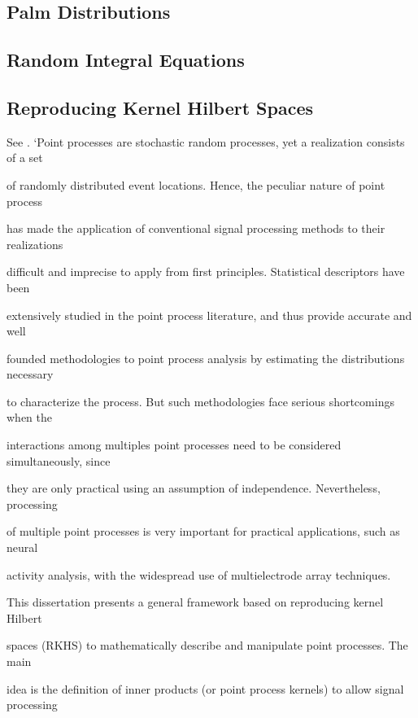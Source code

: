 \documentclass{amsart}
\begin{document}
\subsection{Palm Distributions}

{\cite[1.7]{karr}}

\subsection{Random Integral Equations}

{\cite{RandomIntegralEquations}}

\subsection{Reproducing Kernel Hilbert Spaces}

See {\cite{Paiva08reproducingkernel}}. `Point processes are stochastic random
processes, yet a realization consists of a set

of randomly distributed event locations. Hence, the peculiar nature of point
process

has made the application of conventional signal processing methods to their
realizations

difficult and imprecise to apply from first principles. Statistical
descriptors have been

extensively studied in the point process literature, and thus provide accurate
and well

founded methodologies to point process analysis by estimating the
distributions necessary

to characterize the process. But such methodologies face serious shortcomings
when the

interactions among multiples point processes need to be considered
simultaneously, since

they are only practical using an assumption of independence. Nevertheless,
processing

of multiple point processes is very important for practical applications, such
as neural

activity analysis, with the widespread use of multielectrode array techniques.

This dissertation presents a general framework based on reproducing kernel
Hilbert

spaces (RKHS) to mathematically describe and manipulate point processes. The
main

idea is the definition of inner products (or point process kernels) to allow
signal processing
\end{document}
